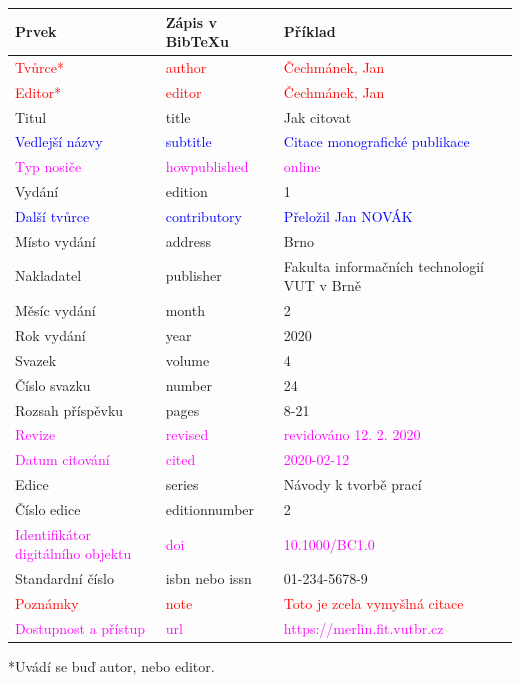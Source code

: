 \begin{tabularx}{\linewidth}{X X X}
    Prvek & Zápis v BibTeXu & Příklad\\\hline
    \textcolor{red}{Tvůrce*} & \textcolor{red}{author} & \textcolor{red}{Čechmánek, Jan}\\
    \textcolor{red}{Editor*} & \textcolor{red}{editor} & \textcolor{red}{Čechmánek, Jan}\\
    Titul & title & Jak citovat\\
    \textcolor{blue}{Vedlejší názvy} & \textcolor{blue}{subtitle} & \textcolor{blue}{Citace monografické publikace}\\
    \textcolor{magenta}{Typ nosiče} & \textcolor{magenta}{howpublished} & \textcolor{magenta}{online}\\
    Vydání & edition & 1\\
    \textcolor{blue}{Další tvůrce} & \textcolor{blue}{contributory} & \textcolor{blue}{Přeložil Jan NOVÁK}\\
    Místo vydání & address & Brno\\
    Nakladatel & publisher & Fakulta informačních technologií VUT v Brně\\
    Měsíc vydání & month & 2\\
    Rok vydání & year & 2020\\
    Svazek & volume & 4\\
    Číslo svazku & number & 24\\
    Rozsah příspěvku & pages & 8-21\\
    \textcolor{magenta}{Revize} & \textcolor{magenta}{revised} & \textcolor{magenta}{revidováno 12. 2. 2020}\\
    \textcolor{magenta}{Datum citování} & \textcolor{magenta}{cited} & \textcolor{magenta}{2020-02-12}\\
    Edice & series & Návody k tvorbě prací\\
    Číslo edice & editionnumber & 2\\
    \textcolor{magenta}{Identifikátor digitálního objektu} & \textcolor{magenta}{doi} & \textcolor{magenta}{10.1000/BC1.0}\\
    Standardní číslo & isbn nebo issn & 01-234-5678-9\\
    \textcolor{red}{Poznámky} & \textcolor{red}{note} & \textcolor{red}{Toto je zcela vymyšlná citace}\\
    \textcolor{magenta}{Dostupnost a přístup} & \textcolor{magenta}{url} & \textcolor{magenta}{https://merlin.fit.vutbr.cz}
\end{tabularx}
*Uvádí se buď autor, nebo editor.

